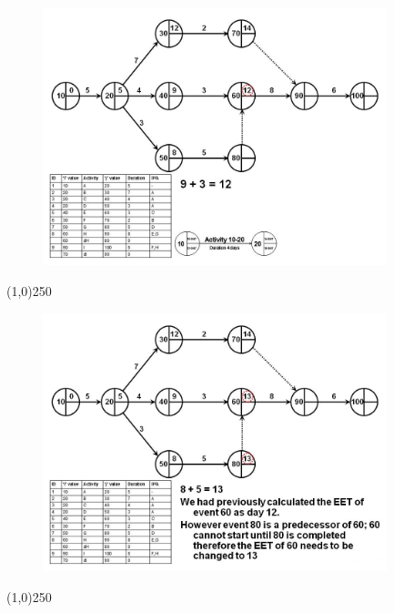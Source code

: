 \begin{frame}
\begin{figure}
	\centering
		\includegraphics[width = 10.0cm]{oldnotes/Slide107.jpg}
\end{figure}
\end{frame}
\begin{center}\line(1,0){250}\end{center}


\begin{frame}
\begin{figure}
	\centering
		\includegraphics[width = 10.0cm]{oldnotes/Slide108.jpg}
\end{figure}
\end{frame}
\begin{center}\line(1,0){250}\end{center}


